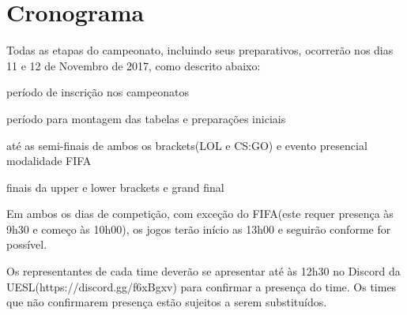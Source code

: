\section{Cronograma}

Todas as etapas do campeonato, incluindo seus preparativos, ocorrerão nos dias 11 e 12 de Novembro de 2017, como descrito abaixo:

\begin{description}[leftmargin=!,labelwidth=\widthof{\bfseries Até 08/11},labelindent=1.5em]
	\item[Até 08/11] período de inscrição nos campeonatos
	\item[10/11] período para montagem das tabelas e preparações iniciais
	\item[11/11] até as semi-finais de ambos os brackets(LOL e CS:GO) e evento presencial modalidade FIFA
	\item[12/11] finais da upper e lower brackets e grand final
\end{description}

Em ambos os dias de competição, com exceção do FIFA(este requer presença às 9h30 e começo às 10h00), os jogos terão início as 13h00 e seguirão conforme for possível.

Os representantes de cada time deverão se apresentar até às 12h30 no Discord da UESL(https://discord.gg/f6xBgxv) para confirmar a presença do time. Os times que não confirmarem presença estão sujeitos a serem substituídos.